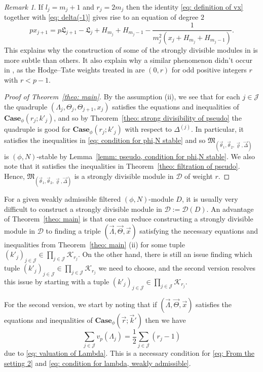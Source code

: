 \documentclass[11pt]{amsart}
\theoremstyle{definition}
\numberwithin{equation}{subsection}
\theoremstyle{plain}
\theoremstyle{plain}
\theoremstyle{plain}
\theoremstyle{plain}
\theoremstyle{plain}
\theoremstyle{plain}
\theoremstyle{plain}
\theoremstyle{plain}
\theoremstyle{plain}
\theoremstyle{plain}
\theoremstyle{plain}
\theoremstyle{plain}
\theoremstyle{definition}
\theoremstyle{definition}
\theoremstyle{definition}
\theoremstyle{remark}
\newtheorem{rema}[equation]{Remark}
\renewcommand{\(}{\textup{(}}
\renewcommand{\)}{\textup{)}}
\newcommand{\fM}{\mathfrak{M}}
\newcommand{\fL}{\mathfrak{L}}
\newcommand{\cD}{\mathcal{D}}
\newcommand{\cJ}{\mathcal{J}}
\newcommand{\vx}{\vec{x}}
\newcommand{\vr}{\vec{r}}
\newcommand{\vk}{\vec{k}}
\newcommand{\cK}{\mathcal{K}}
\newcommand{\vth}{\vec{\theta}}
\newcommand{\vrho}{\vec{\varrho}}
\newcommand{\vDel}{\vec{\Delta}}
\newcommand{\vLam}{\vec{\Lambda}}
\newcommand{\vTh}{\vec{\Theta}}
\begin{document}
\begin{rema}
If $l_j=m_j+1$ and $r_j=2m_j$ then the identity \eqref{eq: definition of vx} together with \eqref{eq: delta(-1)} gives rise to an equation of degree $2$
$$px_{j+1}=p\fL_{j+1}-\fL_j+H_{m_j}+H_{m_j-1}-\frac{1}{m_j^2(x_j+H_{m_j}+H_{m_j-1})}.$$
This explains why the construction of some of the strongly divisible modules in \cite{GP} is more subtle than others. It also explain why a similar phenomenon didn't occur in \cite{BM}, as the Hodge--Tate weights treated in \cite{BM} are $(0,r)$ for odd positive integers $r$ with $r<p-1$.
\end{rema}


\begin{proof}[Proof of Theorem~\ref{theo: main}]
By the assumption (ii), we see that for each $j\in\cJ$ the quadruple $(\Lambda_j,\Theta_j,\Theta_{j+1},x_j)$ satisfies the equations and inequalities of $\mathbf{Case}_\phi(r_j;k'_{j})$, and so by Theorem~\ref{theo: strong divisibility of pseudo} the quadruple is good for $\mathbf{Case}_\phi(r_j;k'_{j})$ with respect to $\Delta^{(j)}$. In particular, it satisfies the inequalities in \eqref{eq: condition for phi,N stable} and so $\fM_{(\vth_1,\vth_2,\vrho,\vDel)}$ is $(\phi,N)$-stable by Lemma~\ref{lemm: pseudo, condition for phi,N stable}. We also note that it satisfies the inequalities in Theorem~\ref{theo: filtration of pseudo}. Hence, $\fM_{(\vth_1,\vth_2,\vrho,\vDel)}$ is a strongly divisible module in $\cD$ of weight $r$.
\end{proof}



For a given weakly admissible filtered $(\phi,N)$-module $D$, it is usually very difficult to construct a strongly divisible module in $\cD:=\cD(D)$. An advantage of Theorem~\ref{theo: main} is that one can reduce constructing a strongly divisible module in $\cD$ to finding a triple $(\vLam,\vTh,\vx)$ satisfying the necessary equations and inequalities from Theorem~\ref{theo: main} (ii) for some tuple $(k'_j)_{j\in\cJ}\in\prod_{j\in\cJ}\cK_{r_j}$. On the other hand, there is still an issue finding which tuple $(k'_j)_{j\in\cJ}\in\prod_{j\in\cJ}\cK_{r_j}$ we need to choose, and the second version resolves this issue by starting with a tuple $(k'_j)_{j\in\cJ}\in\prod_{j\in\cJ}\cK_{r_j}$.


\smallskip

For the second version, we start by noting that if $(\vLam,\vTh,\vx)$ satisfies the equations and inequalities of $\mathbf{Case}_\phi(\vr;\vk')$ then we have
$$\sum_{j\in\cJ} v_p(\Lambda_j)=\frac{1}{2}\sum_{j\in\cJ}(r_j-1)$$
due to \eqref{eq: valuation of Lambda}. This is a necessary condition for \eqref{eq: From the setting 2} and \eqref{eq: condition for lambda, weakly admissible}.
\end{document}

